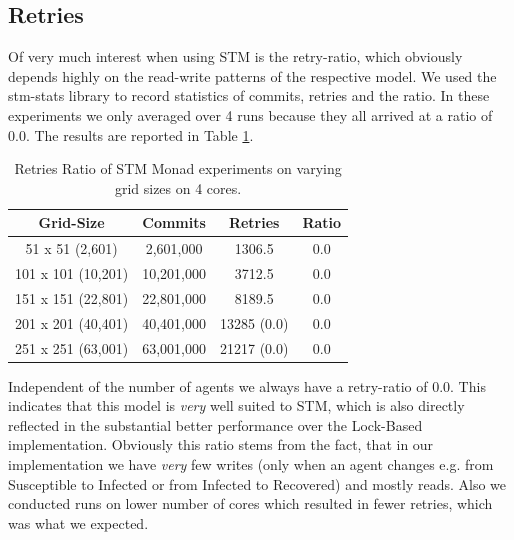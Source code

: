\subsection{Retries}
Of very much interest when using STM is the retry-ratio, which obviously depends highly on the read-write patterns of the respective model. We used the stm-stats library to record statistics of commits, retries and the ratio. In these experiments we only averaged over 4 runs because they all arrived at a ratio of 0.0. The results are reported in Table \ref{tab:retries_stm}.

\begin{table}
	\centering
  	\begin{tabular}{ c || c | c | c }
        Grid-Size 		   & Commits    & Retries  & Ratio \\ \hline \hline 
   		51 x 51 (2,601)    & 2,601,000  & 1306.5   & 0.0 \\ \hline
   		101 x 101 (10,201) & 10,201,000 & 3712.5   & 0.0 \\ \hline
   		151 x 151 (22,801) & 22,801,000 & 8189.5   & 0.0 \\ \hline
   		201 x 201 (40,401) & 40,401,000 & 13285 (0.0) & 0.0 \\ \hline 
   		251 x 251 (63,001) & 63,001,000 & 21217 (0.0) & 0.0
  	\end{tabular}
  	
  	\caption{Retries Ratio of STM Monad experiments on varying grid sizes on 4 cores.}
	\label{tab:retries_stm}
\end{table}

Independent of the number of agents we always have a retry-ratio of 0.0. This indicates that this model is \textit{very} well suited to STM, which is also directly reflected in the substantial better performance over the Lock-Based implementation. Obviously this ratio stems from the fact, that in our implementation we have \textit{very} few writes (only when an agent changes e.g. from Susceptible to Infected or from Infected to Recovered) and mostly reads. Also we conducted runs on lower number of cores which resulted in fewer retries, which was what we expected.

